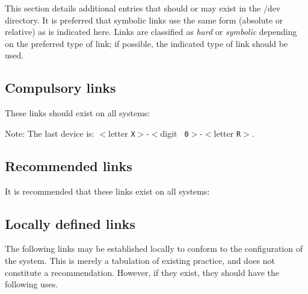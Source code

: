 This section details additional entries that should or may exist in the
{\file /dev} directory.  It is preferred that symbolic links use the
same form (absolute or relative) as is indicated here.  Links are
classified as {\em hard\/} or {\em symbolic\/} depending on the
preferred type of link; if possible, the indicated type of link should
be used.

\subsection{Compulsory links}

These links should exist on all systems:

\begin{nodelist}
\end{nodelist}

\noindent
Note: The last device is: $<$letter {\tt X}$>$-$<$digit {\tt
0}$>$-$<$letter {\tt R}$>$.

\subsection{Recommended links}

It is recommended that these links exist on all systems:

\begin{nodelist}
\end{nodelist}

\subsection{Locally defined links}

The following links may be established locally to conform to the
configuration of the system.  This is merely a tabulation of existing
practice, and does not constitute a recommendation.  However, if they
exist, they should have the following uses.

